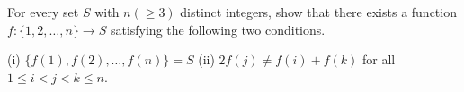For every set $S$ with $n(\ge3)$ distinct integers, show that there exists a function $f:\{1,2,\dots,n\}\rightarrow S$ satisfying the following two conditions.

(i) $\{ f(1),f(2),\dots,f(n)\} = S$
(ii) $2f(j)\neq f(i)+f(k)$ for all $1\le i<j<k\le n$.
